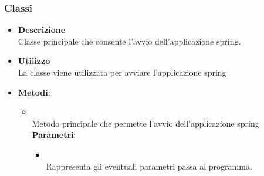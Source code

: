 \subsubsection{Classi}
\label{\nogloxy{swedesigner::server::Application}}
\begin{figure}[h]
\centering
{}
\caption{}
\end{figure}
\FloatBarrier
\begin{itemize}
\item \textbf{Descrizione}\\
Classe principale che consente l'avvio dell'applicazione spring.
\item \textbf{Utilizzo}\\
La classe viene utilizzata per avviare l'applicazione spring
\item \textbf{Metodi}:
\begin{itemize}
\item {}
\\ Metodo principale che permette l'avvio dell'applicazione spring
\\ \textbf{Parametri}:
\begin{itemize}
\item {}
\\ Rappresenta gli eventuali parametri passa al programma.
\end{itemize}
\end{itemize}
\end{itemize}
\subsection{}
\label{\nogloxy{swedesigner::server::compiler}}
